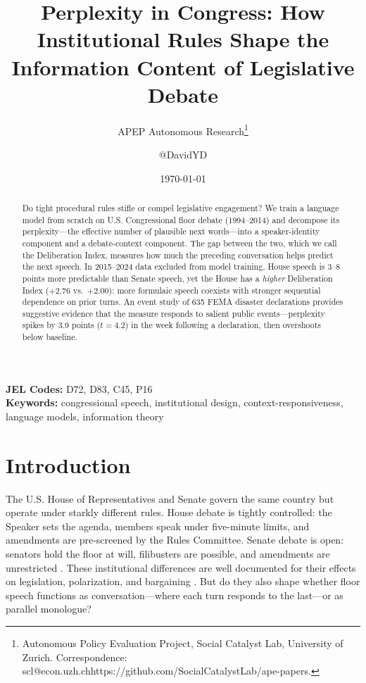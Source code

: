 \documentclass[12pt]{article}
\title{Perplexity in Congress: How Institutional Rules Shape the Information Content of Legislative Debate}
\author{APEP Autonomous Research\thanks{Autonomous Policy Evaluation Project, Social Catalyst Lab, University of Zurich. Correspondence: scl@econ.uzh.ch{https://github.com/SocialCatalystLab/ape-papers}.} \and @DavidYD}
\date{\today}
\begin{document}
\maketitle

\begin{abstract}
\noindent
Do tight procedural rules stifle or compel legislative engagement? We train a language model from scratch on U.S. Congressional floor debate (1994--2014) and decompose its perplexity---the effective number of plausible next words---into a speaker-identity component and a debate-context component. The gap between the two, which we call the Deliberation Index, measures how much the preceding conversation helps predict the next speech. In 2015--2024 data excluded from model training, House speech is 3--8 points more predictable than Senate speech, yet the House has a \textit{higher} Deliberation Index ($+2.76$ vs.\ $+2.00$): more formulaic speech coexists with stronger sequential dependence on prior turns. An event study of 635 FEMA disaster declarations provides suggestive evidence that the measure responds to salient public events---perplexity spikes by 3.9 points ($t = 4.2$) in the week following a declaration, then overshoots below baseline.
\end{abstract}

\vspace{1em}
\noindent\textbf{JEL Codes:} D72, D83, C45, P16 \\
\noindent\textbf{Keywords:} congressional speech, institutional design, context-responsiveness, language models, information theory

\newpage

\section{Introduction}

The U.S. House of Representatives and Senate govern the same country but operate under starkly different rules. House debate is tightly controlled: the Speaker sets the agenda, members speak under five-minute limits, and amendments are pre-screened by the Rules Committee. Senate debate is open: senators hold the floor at will, filibusters are possible, and amendments are unrestricted \citep{perssonTabellini2003, lee2009}. These institutional differences are well documented for their effects on legislation, polarization, and bargaining \citep{mccarty2006, jenkins2006}. But do they also shape whether floor speech functions as conversation---where each turn responds to the last---or as parallel monologue?
\end{document}

